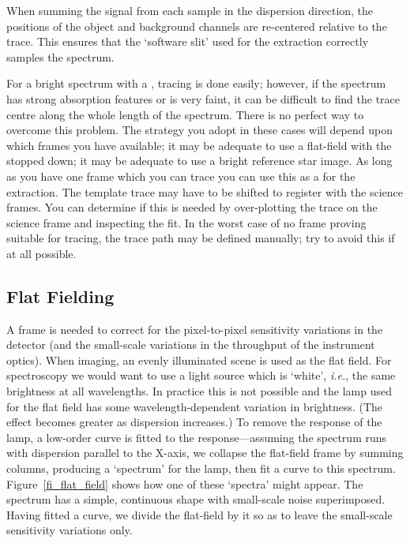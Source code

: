 \documentclass[twoside,11pt]{starlink}
\providecommand{\mlabel}[1]{\xlabel{#1}\label{#1}}
\providecommand{\scspec}[2]{#1}
\begin{document}
When summing the signal from each sample in the dispersion direction, the
positions of the object and background channels are re-centered relative to
the trace.  This ensures that the `software slit' used for the extraction
correctly samples the spectrum.

For a bright spectrum with a , tracing is
done easily; however, if the spectrum has strong absorption features or is
very faint, it can be difficult to find the trace centre along the whole
length of the spectrum.
There is no perfect way to overcome this problem.
The strategy you adopt in these cases will depend upon which frames
you have available; it may be adequate to use a flat-field with the
stopped down; it may be adequate to use a bright reference star image.
As long as you have one frame which you can trace you can use this
as a  for the extraction.
The template trace may have to be shifted to register with the science frames.
You can determine if this is needed by over-plotting the trace on
the science frame and inspecting the fit.
In the worst case of no frame proving suitable for tracing, the trace
path may be defined manually; try to avoid this if at all possible.


\subsection{\mlabel{flat_fielding}Flat Fielding}

A  frame is needed to correct for the
pixel-to-pixel sensitivity variations in the detector (and the small-scale
variations in the throughput of the instrument optics).
When imaging, an evenly illuminated scene is used as the flat field.
For spectroscopy we would want to use a light source
which is `white', {\it{i.e.}}, the same brightness at all wavelengths.
In practice this is not possible and the lamp used for the flat
field has some wavelength-dependent variation in brightness.  (The effect
becomes greater as dispersion increases.)  To remove the response
of the lamp, a low-order curve is fitted to the
response\scspec{---}{ - }assuming the spectrum runs with dispersion parallel
to the X-axis, we collapse the flat-field frame by summing columns, producing
a `spectrum' for the lamp, then fit a curve to this spectrum.
\scspec{Figure~\ref{fi_flat_field}}{The figure below}
shows how one of these `spectra' might appear.
The spectrum has a simple, continuous shape with small-scale noise
superimposed.
Having fitted a curve, we divide the flat-field by it so as to leave
the small-scale sensitivity variations only.
\end{document}
